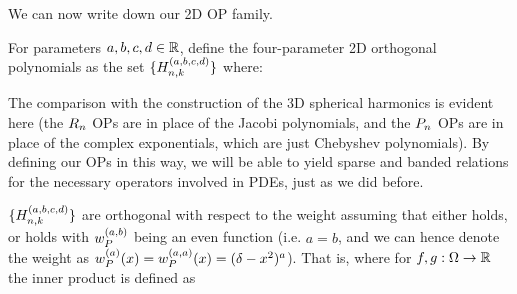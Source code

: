 We can now write down our 2D OP family. 
\begin{definition}\label{def:ds:constuction}
	For parameters $a,b,c,d \in \mathbb{R}$, define the four-parameter 2D orthogonal polynomials as the set $\{H_{n,k}^{(a,b,c,d)}\}$ where:
\end{definition}

The comparison with the construction of the 3D spherical harmonics is evident here (the $R_n$ OPs are in place of the Jacobi polynomials, and the ${P}_n$ OPs are in place of the complex exponentials, which are just Chebyshev polynomials). By defining our OPs in this way, we will be able to yield sparse and banded relations for the necessary operators involved in PDEs, just as we did before.

$\{H_{n,k}^{(a,b,c,d)}\}$ are orthogonal with respect to the weight 
assuming that either  holds, or  holds with $w_P^{(a,b)}$ being an even function (i.e. $a = b$, and we can hence denote the weight as $w_P^{(a)}(x) = w^{(a,a)}_P(x) = (\delta-x^2)^a$). That is,
where for $f, g : \Omega \to \mathbb{R}$ the inner product is defined as 

